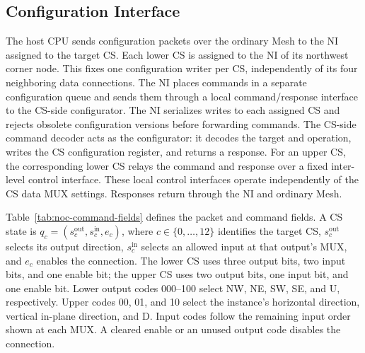\documentclass[conference,10pt]{IEEEtran}
\begin{document}


\subsection{Configuration Interface}
\label{sec:noc-config-interface}

The host CPU sends configuration packets over the ordinary Mesh to the
NI assigned to the target CS. Each lower CS is assigned to the NI of
its northwest corner node. This fixes one configuration writer per CS,
independently of its four neighboring data connections.
The NI places commands in a separate configuration queue and sends them
through a local command/response interface to the CS-side configurator.
The NI serializes writes to each assigned CS and rejects obsolete
configuration versions before forwarding commands.
The CS-side command decoder acts as the configurator: it decodes the
target and operation, writes the CS configuration register, and returns
a response.
For an upper CS, the corresponding lower CS relays the command and
response over a fixed inter-level control interface.
These local control interfaces operate independently of the CS data
MUX settings. Responses return through the NI and ordinary Mesh.

Table~\ref{tab:noc-command-fields} defines the packet and command fields.
A CS state is $q_c=(s_c^{\mathrm{out}},s_c^{\mathrm{in}},e_c)$, where
$c\in\{0,\ldots,12\}$ identifies the target CS,
$s_c^{\mathrm{out}}$ selects its output direction,
$s_c^{\mathrm{in}}$ selects an allowed input at that output's MUX,
and $e_c$ enables the connection.
The lower CS uses three output bits, two input bits, and one enable bit;
the upper CS uses two output bits, one input bit, and one enable bit.
Lower output codes 000--100 select NW, NE, SW, SE, and U, respectively.
Upper codes 00, 01, and 10 select the instance's horizontal direction,
vertical in-plane direction, and D. Input codes follow the remaining
input order shown at each MUX. A cleared enable or an unused output
code disables the connection.
\end{document}
